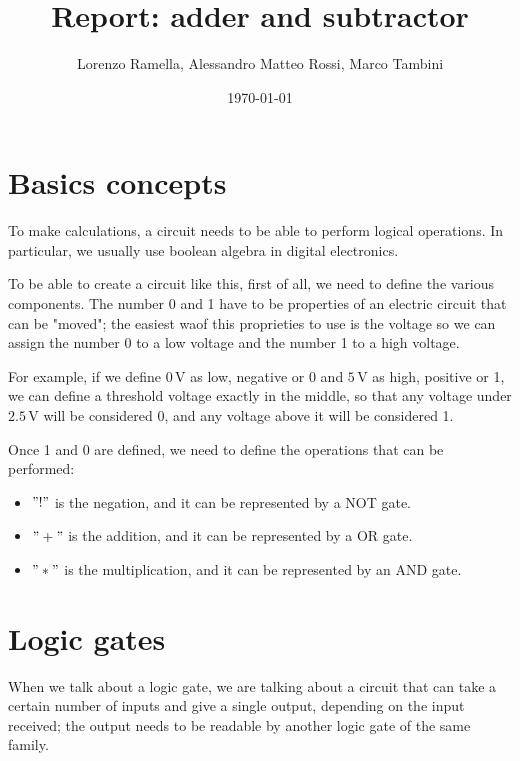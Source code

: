 \documentclass{article}
\title{Report: adder and subtractor}
\author{Lorenzo Ramella, Alessandro Matteo Rossi, Marco Tambini}
\date{\today}
\begin{document}
\maketitle

\tableofcontents

\section{Basics concepts}

To make calculations, a circuit needs to be able to perform logical operations. In particular, we usually use boolean algebra in digital electronics. 

\vspace{3mm}

To be able to create a circuit like this, first of all, we need to define the various components.
The number 0 and 1 have to be properties of an electric circuit that can be "moved"; the easiest waof this proprieties to use is the voltage so we can assign the number 0 to a low voltage and the number 1 to a high voltage. 

\vspace{3mm}

For example, if we define $0\,\textrm{V}$ as low, negative or 0 and $5\,\textrm{V}$ as high, positive or 1, we can define a threshold voltage exactly in the middle, so that any voltage under $2.5\,\textrm{V}$ will be considered 0, and any voltage above it will be considered 1.

\vspace{3mm}

Once 1 and 0 are defined, we need to define the operations that can be performed:

\begin{itemize}
\item $"!"$ is the negation, and it can be represented by a NOT gate.
\item $"+"$ is the addition, and it can be represented by a OR gate.
\item $"*"$ is the multiplication, and it can be represented by an AND gate.
\end{itemize}

\section{Logic gates}

When we talk about a logic gate, we are talking about a circuit that can take a certain number of inputs and give a single output, depending on the input received; the output needs to be readable by another logic gate of the same family.
\end{document}
